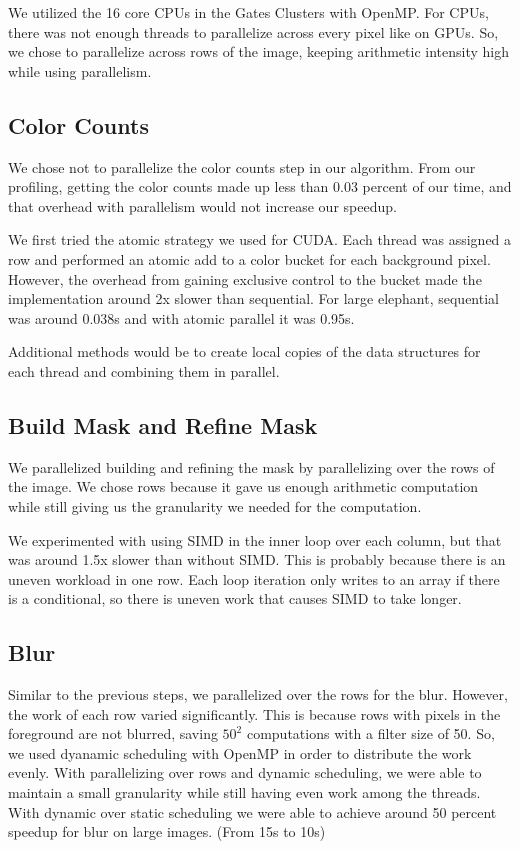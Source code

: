 \documentclass[12pt]{article}
\begin{document}
We utilized the 16 core CPUs in the Gates Clusters with OpenMP. For CPUs, there
was not enough threads to parallelize across every pixel like on GPUs. So, we
chose to parallelize across rows of the image, keeping arithmetic intensity
high while using parallelism.

\subsection{Color Counts}

We chose not to parallelize the color counts step in our algorithm. From our
profiling, getting the color counts made up less than 0.03 percent of our time,
and that overhead with parallelism would not increase our speedup.

We first tried the atomic strategy we used for CUDA. Each thread was assigned a
row and performed an atomic add to a color bucket for each background pixel.
However, the overhead from gaining exclusive control to the bucket made the
implementation around 2x slower than sequential. For large elephant, sequential
was around 0.038s and with atomic parallel it was 0.95s.

Additional methods would be to create local copies of the data structures for
each thread and combining them in parallel.

\subsection{Build Mask and Refine Mask}

We parallelized building and refining the mask by parallelizing over the rows
of the image. We chose rows because it gave us enough arithmetic computation
while still giving us the granularity we needed for the computation.

We experimented with using SIMD in the inner loop over each column, but that
was around 1.5x slower than without SIMD. This is probably because there is an
uneven workload in one row. Each loop iteration only writes to an array if
there is a conditional, so there is uneven work that causes SIMD to take
longer.

\subsection{Blur}

Similar to the previous steps, we parallelized over the rows for the blur.
However, the work of each row varied significantly. This is because rows with
pixels in the foreground are not blurred, saving $50^2$ computations with a
filter size of 50. So, we used dyanamic scheduling with OpenMP in order to
distribute the work evenly. With parallelizing over rows and dynamic
scheduling, we were able to maintain a small granularity while still having
even work among the threads. With dynamic over static scheduling we were able
to achieve around 50 percent speedup for blur on large images. (From 15s to
10s)
\end{document}
